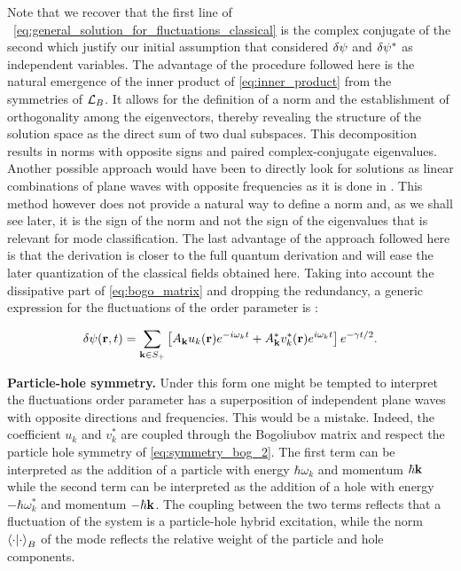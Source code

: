 Note that we recover that the first line of ~\eqref{eq:general_solution_for_fluctuations_classical} is the complex conjugate of the second which justify our initial assumption that considered $\delta\psi$ and $\delta\psi^*$ as independent variables. The advantage of the
procedure followed here is the natural emergence of the inner product of \autoref{eq:inner_product} from the symmetries of $\mathcal{L}_B$. It allows for the definition of a norm and the establishment of orthogonality among the eigenvectors, 
thereby revealing the structure of the solution space as the direct sum of two dual subspaces. This decomposition results in norms with opposite signs and paired complex-conjugate eigenvalues. Another possible approach would have been
to directly look for solutions as linear combinations of plane waves with opposite frequencies as it is done in \cite{pethick_bose-einstein_2008}. This method however does not provide a natural way to define a norm and, as we shall
see later, it is the sign of the norm and not the sign of the eigenvalues that is relevant for mode classification. The last advantage of the approach followed here is that the derivation
is closer to the full quantum derivation and will ease the later quantization of the classical fields obtained here. Taking into account the dissipative part of \autoref{eq:bogo_matrix} and dropping the redundancy, a generic
expression for the fluctuations of the order parameter is :

\begin{equation}
    \delta\psi(\mathbf{r},t) = \sum_{\mathbf{k} \in S_+} \left[A_{\mathbf{k}} u_k(\mathbf{r})e^{-i\omega_kt}+A_{\mathbf{k}}^*v_k^*(\mathbf{r})e^{i\omega_kt}\right]e^{-\gamma t/2}.
    \label{eq:fluctuation_order_parameter}
\end{equation}
\bigskip

\textbf{Particle-hole symmetry.} Under this form one might be tempted to interpret the fluctuations order parameter has a superposition of independent plane waves with opposite directions and frequencies.
This would be a mistake. Indeed, the coefficient $u_k$ and $v_k^*$ are coupled through the Bogoliubov matrix and respect the particle hole symmetry of \autoref{eq:symmetry_bog_2}. The first term
can be interpreted as the addition of a particle with energy $\hbar\omega_k$ and momentum $\hbar\mathbf{k}$ while the second term can be interpreted as the addition of a hole with energy $-\hbar\omega_k^*$ and momentum $-\hbar\mathbf{k}$. The coupling
between the two terms reflects that a fluctuation of the system is a particle-hole hybrid excitation, while the norm $\bra{\cdot}\ket{\cdot}_B$ of the mode reflects the relative weight of the particle and hole components.


